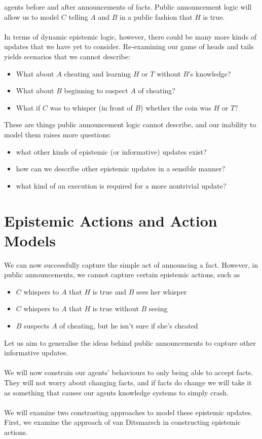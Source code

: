 \documentclass[12pt, a4paper, twoside]{article}
\begin{document}
agents before and after announcements of facts.
Public announcement logic will allow us to model $C$ telling $A$ and $B$ in a
public fashion that $H$ is true.\\
\\
In terms of dynamic epistemic logic, however, there could be many more kinds of
updates that we have yet to consider.
Re-examining our game of heads and tails yields scenarios that we cannot
describe:
\begin{itemize}
	\item What about $A$ cheating and learning $H$ or $T$ without $B$'s knowledge?
	\item What about $B$ beginning to suspect $A$ of cheating?
	\item What if $C$ was to whisper (in front of $B$) whether the coin was $H$
	or $T$?
\end{itemize}
These are things public announcement logic cannot describe, and our inability to
model them raises more questions:
\begin{itemize}
	\item what other kinds of epistemic (or informative) updates exist?
	\item how can we describe other epistemic updates in a sensible manner?
	\item what kind of an execution is required for a more nontrivial update?
\end{itemize}

\section{Epistemic Actions and Action Models} \label{estAct}
We can now successfully capture the simple act of announcing a fact.
However, in public announcements, we cannot capture certain epistemic actions,
such as
\begin{itemize} 
  \item $C$ whispers to $A$ that $H$ is true and $B$ sees her whisper
  \item $C$ whispers to $A$ that $H$ is true without $B$ seeing
  \item $B$ suspects $A$ of cheating, but he isn't sure if she's cheated
\end{itemize}
Let us aim to generalise the ideas behind public announcements to capture other
informative updates.\\
\\
We will now constrain our agents' behaviours to only being able to accept facts.
They will not worry about changing facts, and if facts do change we will take it
as something that causes our agents knowledge systems to simply crash.\\
\\
We will examine two constrasting approaches to model these epistemic updates.
First, we examine the approach of van Ditsmarsch in constructing epistemic
actions.
\end{document}
